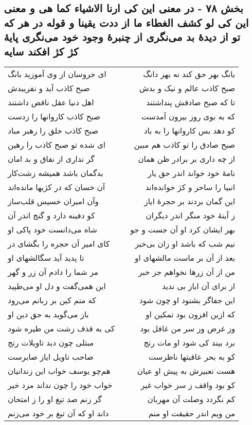 \begin{center}
\section*{بخش ۷۸ - در معنی این کی ارنا الاشیاء کما هی و معنی این کی لو کشف الغطاء ما از ددت یقینا و قوله  در هر که تو از دیدهٔ بد می‌نگری  از چنبرهٔ وجود خود می‌نگری  پایهٔ کژ کژ افکند سایه}
\label{sec:sh078}
\begin{longtable}{l p{0.5cm} r}
ای خروسان از وی آموزید بانگ
&&
بانگ بهر حق کند نه بهر دانگ
\\
صبح کاذب آید و نفریبدش
&&
صبح کاذب عالم و نیک و بدش
\\
اهل دنیا عقل ناقص داشتند
&&
تا که صبح صادقش پنداشتند
\\
صبح کاذب کاروانها را زدست
&&
که به بوی روز بیرون آمدست
\\
صبح کاذب خلق را رهبر مباد
&&
کو دهد بس کاروانها را به باد
\\
ای شده تو صبح کاذب را رهین
&&
صبح صادق را تو کاذب هم مبین
\\
گر نداری از نفاق و بد امان
&&
از چه داری بر برادر ظن همان
\\
بدگمان باشد همیشه زشت‌کار
&&
نامهٔ خود خواند اندر حق یار
\\
آن خسان که در کژیها مانده‌اند
&&
انبیا را ساحر و کژ خوانده‌اند
\\
وآن امیران خسیس قلب‌ساز
&&
این گمان بردند بر حجرهٔ ایاز
\\
کو دفینه دارد و گنج اندر آن
&&
ز آینهٔ خود منگر اندر دیگران
\\
شاه می‌دانست خود پاکی او
&&
بهر ایشان کرد او آن جست و جو
\\
کای امیر آن حجره را بگشای در
&&
نیم شب که باشد او زان بی‌خبر
\\
تا پدید آید سگالشهای او
&&
بعد از آن بر ماست مالشهای او
\\
مر شما را دادم آن زر و گهر
&&
من از آن زرها نخواهم جز خبر
\\
این همی‌گفت و دل او می‌طپید
&&
از برای آن ایاز بی ندید
\\
که منم کین بر زبانم می‌رود
&&
این جفاگر بشنود او چون شود
\\
باز می‌گوید به حق دین او
&&
که ازین افزون بود تمکین او
\\
کی به قذف زشت من طیره شود
&&
وز غرض وز سر من غافل بود
\\
مبتلی چون دید تاویلات رنج
&&
برد بیند کی شود او مات رنج
\\
صاحب تاویل ایاز صابرست
&&
کو به بحر عاقبتها ناظرست
\\
هم‌چو یوسف خواب این زندانیان
&&
هست تعبیرش به پیش او عیان
\\
خواب خود را چون نداند مرد خیر
&&
کو بود واقف ز سر خواب غیر
\\
گر زنم صد تیغ او را ز امتحان
&&
کم نگردد وصلت آن مهربان
\\
داند او که آن تیغ بر خود می‌زنم
&&
من ویم اندر حقیقت او منم
\\
\end{longtable}
\end{center}
